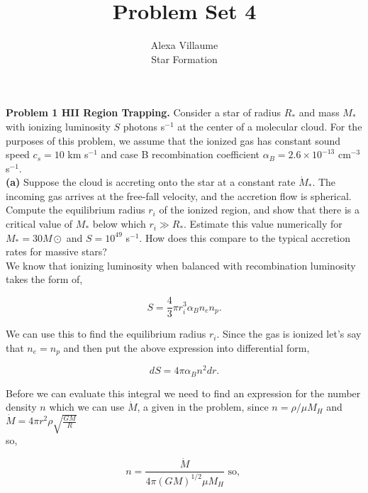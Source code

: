 \documentclass[12pt]{article}
\begin{document}
 
 \title{Problem Set 4}
\author{Alexa Villaume\\ 
Star Formation} 
 
\maketitle
 
\noindent \textbf{Problem 1 HII Region Trapping.} Consider a star of radius $R_*$ and mass $M_*$ with ionizing luminosity $S$ photons s$^{-1}$ at the center of a molecular cloud. For the purposes of this problem, we assume that the ionized gas has constant sound speed $c_s = 10$ km s$^{-1}$ and case B recombination coefficient $\alpha_B = 2.6 \times 10^{-13}$ cm$^{-3}$ s$^{-1}$. \\ 

\noindent \textbf{(a)} Suppose the cloud is accreting onto the star at a constant rate $\dot{M}_*$. The incoming gas arrives at the free-fall velocity, and the accretion flow is spherical. Compute the equilibrium radius $r_i$ of the ionized region, and show that there is a critical value of $M_*$ below which $r_i \gg R_*$. Estimate this value numerically for $M_* = 30 M\odot$ and $S = 10^{49}$ s$^{-1}$. How does this compare to the typical accretion rates for massive stars? \\

\noindent We know that ionizing luminosity when balanced with recombination luminosity takes the form of,

\begin{equation}
S = \frac{4}{3} \pi r^3_{i} \alpha_B n_e n_p.
\end{equation}

\noindent We can use this to find the equilibrium radius $r_i$. Since the gas is ionized let's say that $n_e = n_p$ and then put the above expression into differential form,

\begin{equation}
dS  = 4 \pi \alpha_B n^2 dr.
\end{equation}

\noindent Before we can evaluate this integral we need to find an expression for the number density $n$ which we can use $\dot{M}$, a given in the problem, since $n = \rho / \mu M_H$ and $\dot{M} =  4\pi r^2\rho \sqrt{\frac{GM}{R}}$\\ so, 

\begin{equation}
n = \frac{\dot{M}}{4 \pi \left(G M\right)^{1/2} \mu M_H} \text{ so, }
\end{equation}
\end{document}
